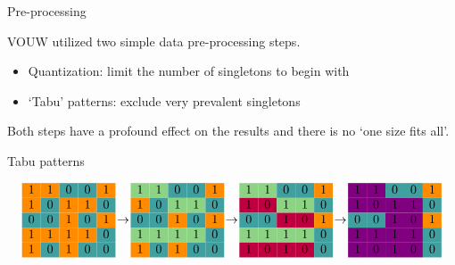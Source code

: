 \documentclass[11pt]{beamer}
\begin{document}

\begin{frame}{Pre-processing}

VOUW utilized two simple data pre-processing steps.
\begin{itemize}
\item Quantization: limit the number of singletons to begin with
\item `Tabu' patterns: exclude very prevalent singletons 
\end{itemize}

Both steps have a profound effect on the results and there is no `one size fits all'.

\end{frame}


\begin{frame}{Tabu patterns}

\newcommand{\ca}{\cellcolor{cyan!45!yellow}}
\newcommand{\cb}{\cellcolor{red!75!blue}}
\newcommand{\cc}{\cellcolor{violet}}
\newcommand{\cd}{\cellcolor{teal!75}}
\newcommand{\ce}{\cellcolor{red!45!yellow}}

\small
$$
\begin{matrix}
\ce 1 & \ce 1 & \cd 0 & \cd 0 & \ce 1  \\
\ce 1 & \cd 0 & \ce 1 & \ce 1 & \cd 0  \\
\cd 0 & \cd 0 & \ce 1 & \cd 0 & \ce 1  \\
\ce 1 & \ce 1 & \ce 1 & \ce 1 & \cd 0  \\
\ce 1 & \cd 0 & \ce 1 & \cd 0 & \cd 0  \\
\end{matrix}
\ \rightarrow \
\begin{matrix}
\ca 1 & \ca 1 & \cd 0 & \cd 0 & \ce 1  \\
\ce 1 & \cd 0 & \ca 1 & \ca 1 & \cd 0  \\
\cd 0 & \cd 0 & \ce 1 & \cd 0 & \ce 1  \\
\ca 1 & \ca 1 & \ca 1 & \ca 1 & \cd 0  \\
\ce 1 & \cd 0 & \ce 1 & \cd 0 & \cd 0  \\
\end{matrix}
\ \rightarrow \
\begin{matrix}
\ca 1 & \ca 1 & \cd 0 & \cd 0 & \ce 1  \\
\cb 1 & \cb 0 & \ca 1 & \ca 1 & \cd 0  \\
\cd 0 & \cd 0 & \cb 1 & \cb 0 & \ce 1  \\
\ca 1 & \ca 1 & \ca 1 & \ca 1 & \cd 0  \\
\cb 1 & \cb 0 & \cb 1 & \cb 0 & \cd 0  \\
\end{matrix}
\ \rightarrow \
\begin{matrix}
\cc 1 & \cc 1 & \cd 0 & \cd 0 & \ce 1  \\
\cc 1 & \cc 0 & \cc 1 & \cc 1 & \cd 0  \\
\cd 0 & \cd 0 & \cc 1 & \cc 0 & \ce 1  \\
\cc 1 & \cc 1 & \cc 1 & \cc 1 & \cd 0  \\
\cc 1 & \cc 0 & \cc 1 & \cc 0 & \cd 0  \\
\end{matrix}
$$


\end{frame}
\end{document}
